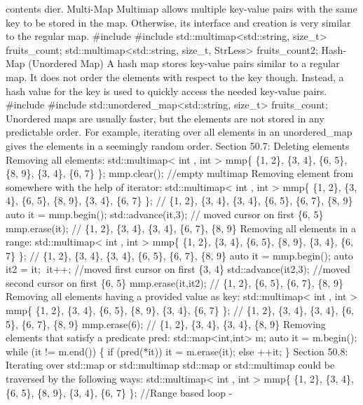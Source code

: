 contents dier. Multi-Map Multimap allows multiple key-value pairs with
the same key to be stored in the map. Otherwise, its interface and
creation is very similar to the regular map. \#include \#include
std::multimap\textless std::string, size\_t\textgreater{} fruits\_count;
std::multimap\textless std::string, size\_t, StrLess\textgreater{}
fruits\_count2; Hash-Map (Unordered Map) A hash map stores key-value
pairs similar to a regular map. It does not order the elements with
respect to the key though. Instead, a hash value for the key is used to
quickly access the needed key-value pairs. \#include \#include
std::unordered\_map\textless std::string, size\_t\textgreater{}
fruits\_count; Unordered maps are usually faster, but the elements are
not stored in any predictable order. For example, iterating over all
elements in an unordered\_map gives the elements in a seemingly random
order. Section 50.7: Deleting elements Removing all elements:
std::multimap\textless{} int , int \textgreater{} mmp\{ \{1, 2\}, \{3,
4\}, \{6, 5\}, \{8, 9\}, \{3, 4\}, \{6, 7\} \}; mmp.clear(); //empty
multimap Removing element from somewhere with the help of iterator:
std::multimap\textless{} int , int \textgreater{} mmp\{ \{1, 2\}, \{3,
4\}, \{6, 5\}, \{8, 9\}, \{3, 4\}, \{6, 7\} \}; // \{1, 2\}, \{3, 4\},
\{3, 4\}, \{6, 5\}, \{6, 7\}, \{8, 9\} auto it = mmp.begin();
std::advance(it,3); // moved cursor on first \{6, 5\} mmp.erase(it); //
\{1, 2\}, \{3, 4\}, \{3, 4\}, \{6, 7\}, \{8, 9\} Removing all elements
in a range: std::multimap\textless{} int , int \textgreater{} mmp\{ \{1,
2\}, \{3, 4\}, \{6, 5\}, \{8, 9\}, \{3, 4\}, \{6, 7\} \}; // \{1, 2\},
\{3, 4\}, \{3, 4\}, \{6, 5\}, \{6, 7\}, \{8, 9\} auto it = mmp.begin();
auto it2 = it; it++; //moved first cursor on first \{3, 4\}
std::advance(it2,3); //moved second cursor on first \{6, 5\}
mmp.erase(it,it2); // \{1, 2\}, \{6, 5\}, \{6, 7\}, \{8, 9\} Removing
all elements having a provided value as key: std::multimap\textless{}
int , int \textgreater{} mmp\{ \{1, 2\}, \{3, 4\}, \{6, 5\}, \{8, 9\},
\{3, 4\}, \{6, 7\} \}; // \{1, 2\}, \{3, 4\}, \{3, 4\}, \{6, 5\}, \{6,
7\}, \{8, 9\} mmp.erase(6); // \{1, 2\}, \{3, 4\}, \{3, 4\}, \{8, 9\}
Removing elements that satisfy a predicate pred:
std::map\textless int,int\textgreater{} m; auto it = m.begin(); while
(it != m.end()) \{ if (pred(*it)) it = m.erase(it); else ++it; \}
Section 50.8: Iterating over std::map or std::multimap std::map or
std::multimap could be traversed by the following ways:
std::multimap\textless{} int , int \textgreater{} mmp\{ \{1, 2\}, \{3,
4\}, \{6, 5\}, \{8, 9\}, \{3, 4\}, \{6, 7\} \}; //Range based loop -
